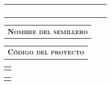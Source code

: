 \documentclass[12pt]{report}
\newcommand\wcolor{mycolor}
\newcommand\wcolorC{mycolorC}
\begin{document}
{\myfont
\noindent
\ifthenelse{\advances < \tope}{\mypageT{\solution}{\wcolorBar}{\advances}}{\mypageO}
\vspace{0.3 cm}

\noindent
\begin{minipage}{\textwidth}
	\begin{tabular}{l}
		\begin{minipage}[t]{0.5\textwidth}%
			\cellcolor{\wcolor}\textcolor{white}{\textsc{\textbf{Información del proyecto}}}
		\end{minipage}
	\end{tabular}	
\end{minipage}
\noindent
\begin{minipage}{\textwidth}
	\begin{tabular}{l}
		\begin{minipage}[t]{0.7\textwidth}%
			\cellcolor{\wcolorC}\textsc{\textbf{Nombre del semillero}}
		\end{minipage}
		\vspace{0.1cm}
	\end{tabular}	
	\begin{tabular}{l}
		\begin{minipage}[t]{0.28\textwidth}%
			\centering
			\cellcolor{\wcolorC}\textsc{\textbf{Código del proyecto}}
		\end{minipage}
		\vspace{0.1cm}
	\end{tabular}
\end{minipage}

\noindent
\begin{minipage}{\textwidth}
	\begin{tabular}{l}
		\begin{minipage}[t]{0.7\textwidth}%
			{\hotbed}
		\end{minipage}
	\end{tabular}	
	\begin{tabular}{c}
		\begin{minipage}[t]{0.28\textwidth}
			\centering
			\textbf{\code}
		\end{minipage}
	\end{tabular}	
\end{minipage}

}
\end{document}
